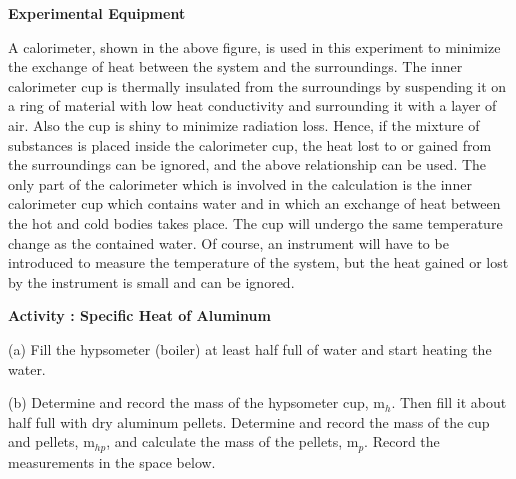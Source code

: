 \vspace{0.3cm}
{\centering {}  \par}
\vspace{0.3cm}

\textbf{Experimental Equipment} 

A calorimeter, shown in the above figure, is used in this experiment
to minimize the exchange of heat between the system and the surroundings.
The inner calorimeter cup is thermally insulated from the surroundings
by suspending it on a ring of material with low heat conductivity
and surrounding it with a layer of air. Also the cup is shiny to minimize
radiation loss. Hence, if the mixture of substances is placed inside
the calorimeter cup, the heat lost to or gained from the surroundings
can be ignored, and the above relationship can be used. The only part
of the calorimeter which is involved in the calculation is the inner
calorimeter cup which contains water and in which an exchange of heat
between the hot and cold bodies takes place. The cup will undergo
the same temperature change as the contained water. Of course, an
instrument will have to be introduced to measure the temperature of
the system, but the heat gained or lost by the instrument is small
and can be ignored.

\textbf{Activity : Specific Heat of Aluminum}

(a) Fill the hypsometer (boiler) at least half full of water and start
heating the water.

(b) Determine and record the mass of the hypsometer cup, m\( _{h} \).
Then fill it about half full with dry aluminum pellets. Determine
and record the mass of the cup and pellets, m\( _{hp} \), and calculate
the mass of the pellets, m\( _{p} \). Record the measurements in
the space below.
\vspace{15mm}


